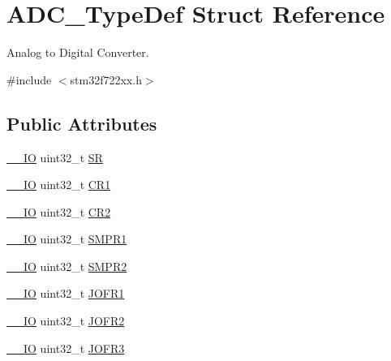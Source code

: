 \hypertarget{struct_a_d_c___type_def}{}\section{A\+D\+C\+\_\+\+Type\+Def Struct Reference}
\label{struct_a_d_c___type_def}


Analog to Digital Converter.  




{\ttfamily \#include $<$stm32f722xx.\+h$>$}

\subsection*{Public Attributes}
\begin{DoxyCompactItemize}
\item 
\mbox{\hyperlink{core__sc300_8h_aec43007d9998a0a0e01faede4133d6be}{\+\_\+\+\_\+\+IO}} uint32\+\_\+t \mbox{\hyperlink{struct_a_d_c___type_def_a9745df96e98f3cdc2d05ccefce681f64}{SR}}
\item 
\mbox{\hyperlink{core__sc300_8h_aec43007d9998a0a0e01faede4133d6be}{\+\_\+\+\_\+\+IO}} uint32\+\_\+t \mbox{\hyperlink{struct_a_d_c___type_def_a89b1ff4376683dd2896ea8b32ded05b2}{C\+R1}}
\item 
\mbox{\hyperlink{core__sc300_8h_aec43007d9998a0a0e01faede4133d6be}{\+\_\+\+\_\+\+IO}} uint32\+\_\+t \mbox{\hyperlink{struct_a_d_c___type_def_a1053a65a21af0d27afe1bf9cf7b7aca7}{C\+R2}}
\item 
\mbox{\hyperlink{core__sc300_8h_aec43007d9998a0a0e01faede4133d6be}{\+\_\+\+\_\+\+IO}} uint32\+\_\+t \mbox{\hyperlink{struct_a_d_c___type_def_a73009a8122fcc628f467a4e997109347}{S\+M\+P\+R1}}
\item 
\mbox{\hyperlink{core__sc300_8h_aec43007d9998a0a0e01faede4133d6be}{\+\_\+\+\_\+\+IO}} uint32\+\_\+t \mbox{\hyperlink{struct_a_d_c___type_def_a9e68fe36c4c8fbbac294b5496ccf7130}{S\+M\+P\+R2}}
\item 
\mbox{\hyperlink{core__sc300_8h_aec43007d9998a0a0e01faede4133d6be}{\+\_\+\+\_\+\+IO}} uint32\+\_\+t \mbox{\hyperlink{struct_a_d_c___type_def_aa005e656f528aaad28d70d61c9db9b81}{J\+O\+F\+R1}}
\item 
\mbox{\hyperlink{core__sc300_8h_aec43007d9998a0a0e01faede4133d6be}{\+\_\+\+\_\+\+IO}} uint32\+\_\+t \mbox{\hyperlink{struct_a_d_c___type_def_aa20f76044c11042dde41c1060853fb82}{J\+O\+F\+R2}}
\item 
\mbox{\hyperlink{core__sc300_8h_aec43007d9998a0a0e01faede4133d6be}{\+\_\+\+\_\+\+IO}} uint32\+\_\+t \mbox{\hyperlink{struct_a_d_c___type_def_ae9c78142f6edf8122384263878d09015}{J\+O\+F\+R3}}

\end{DoxyCompactItemize}

